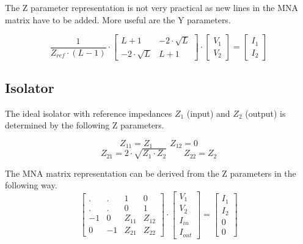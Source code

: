 The Z parameter representation is not very practical as new lines
in the MNA matrix have to be added. More useful are the Y parameters.

\begin{equation}
\frac{1}{Z_{ref}\cdot (L-1)}\cdot
\begin{bmatrix}
 L+1            & -2\cdot\sqrt{L} \\
-2\cdot\sqrt{L} & L+1
\end{bmatrix}
\cdot
\begin{bmatrix}
V_{1}\\
V_{2}
\end{bmatrix}
=
\begin{bmatrix}
I_{1}\\
I_{2}
\end{bmatrix}
\end{equation}



\subsection{Isolator}

The ideal isolator with reference impedances $Z_1$ (input) and $Z_2$
(output) is determined by the following Z parameters.

\begin{equation}
Z_{11} = Z_1  \qquad
Z_{12} = 0
\end{equation}
\begin{equation}
Z_{21} = 2\cdot\sqrt{Z_1\cdot Z_2}  \qquad
Z_{22} = Z_2
\end{equation}

The MNA matrix representation can be derived from the Z parameters in the
following way.
\begin{equation}
\begin{bmatrix}
 . & .  & 1  & 0 \\
 . & .  &  0 & 1 \\
-1 &  0 & Z_{11} & Z_{12}\\
 0 & -1 & Z_{21} & Z_{22}
\end{bmatrix}
\cdot
\begin{bmatrix}
V_{1}\\
V_{2}\\
I_{in}\\
I_{out}
\end{bmatrix}
=
\begin{bmatrix}
I_{1}\\
I_{2}\\
0\\
0
\end{bmatrix}
\end{equation}

